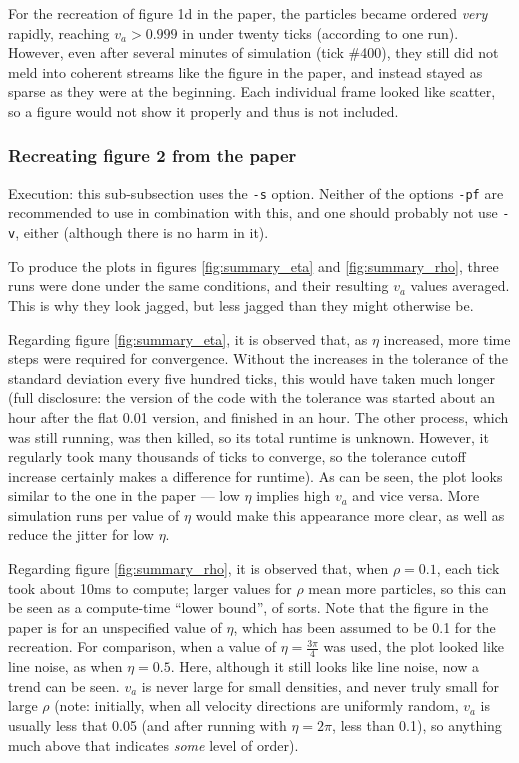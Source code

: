 \documentclass{article}
\begin{document}
For the recreation of figure 1d in the paper, the particles became ordered
\emph{very} rapidly, reaching $v_a>0.999$ in under twenty ticks (according to
one run).  However, even after several minutes of simulation (tick \#400), they
still did not meld into coherent streams like the figure in the paper, and
instead stayed as sparse as they were at the beginning.  Each individual frame
looked like scatter, so a figure would not show it properly and thus is not
included.

\subsubsection{Recreating figure 2 from the paper}

Execution: this sub-subsection uses the \verb|-s| option.  Neither of the
options \verb|-pf| are recommended to use in combination with this, and one
should probably not use \verb|-v|, either (although there is no harm in it).


To produce the plots in figures \ref{fig:summary_eta} and \ref{fig:summary_rho},
three runs were done under the same conditions, and their resulting $v_a$ values
averaged.  This is why they look jagged, but less jagged than they might
otherwise be.


Regarding figure \ref{fig:summary_eta}, it is observed that, as $\eta$
increased, more time steps were required for convergence.  Without the increases
in the tolerance of the standard deviation every five hundred ticks, this would
have taken much longer (full disclosure: the version of the code with the
tolerance was started about an hour after the flat 0.01 version, and finished in
an hour.  The other process, which was still running, was then killed, so its
total runtime is unknown.  However, it regularly took many thousands of ticks to
converge, so the tolerance cutoff increase certainly makes a difference for
runtime).  As can be seen, the plot looks similar to the one in the paper ---
low $\eta$ implies high $v_a$ and vice versa.  More simulation runs per value of
$\eta$ would make this appearance more clear, as well as reduce the jitter for
low $\eta$.


Regarding figure \ref{fig:summary_rho}, it is observed that, when $\rho=0.1$,
each tick took about 10ms to compute; larger values for $\rho$ mean more
particles, so this can be seen as a compute-time ``lower bound'', of sorts.
Note that the figure in the paper is for an unspecified value of $\eta$, which
has been assumed to be 0.1 for the recreation.  For comparison, when a value of
$\eta=\frac{3\pi}{4}$ was used, the plot looked like line noise, as when
$\eta=0.5$.  Here, although it still looks like line noise, now a trend can be
seen.  $v_a$ is never large for small densities, and never truly small for large
$\rho$ (note: initially, when all velocity directions are uniformly random,
$v_a$ is usually less that 0.05 (and after running with $\eta=2\pi$, less than
0.1), so anything much above that indicates \emph{some} level of order).
\end{document}
